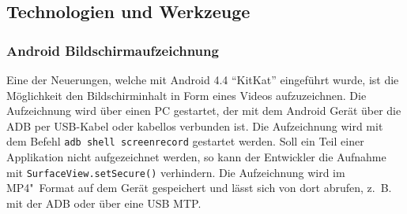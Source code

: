 \subsection{Technologien und Werkzeuge}

\subsubsection{Android Bildschirmaufzeichnung}
Eine der Neuerungen, welche mit Android 4.4 \enquote{KitKat} eingeführt wurde, ist die Möglichkeit den Bildschirminhalt in Form eines Videos aufzuzeichnen.
Die Aufzeichnung wird über einen PC gestartet, der mit dem Android Gerät über die \ac{ADB} \cite{AndroidDevelopers.2014b} per \ac{USB}-Kabel oder kabellos verbunden ist.
Die Aufzeichnung wird mit dem Befehl \texttt{adb shell screenrecord} gestartet werden.
Soll ein Teil einer Applikation nicht aufgezeichnet werden, so kann der Entwickler die Aufnahme mit \texttt{SurfaceView.setSecure()} verhindern.
Die Aufzeichnung wird im MP4"~Format auf dem Gerät gespeichert und lässt sich von dort abrufen, z.~B. mit der \ac{ADB} oder über eine \ac{USB} \ac{MTP}.
\cite[Vgl.][]{AndroidDevelopers.2014}
